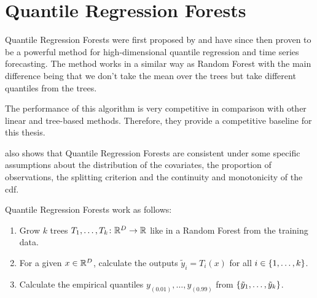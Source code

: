 \section{Quantile Regression Forests}
\label{sec:qrf}

Quantile Regression Forests were first proposed by \Textcite{Meinshausen2006}
and have since then proven to be a powerful method for high-dimensional quantile 
regression and time series forecasting. 
The method works in a similar way as Random Forest with the main difference 
being that we don't take the mean over the trees but take different quantiles 
from the trees.

The performance of this algorithm is very competitive in comparison with other 
linear and tree-based methods.
Therefore, they provide a competitive baseline for this thesis. 

\Textcite{Meinshausen2006} also shows that Quantile Regression Forests are consistent 
under some specific assumptions about the distribution of the covariates, the proportion of observations, the splitting criterion and the 
continuity and monotonicity of the \gls{cdf}.

Quantile Regression Forests work as follows:
\begin{enumerate}
    \item Grow \(k\) trees \(T_1, \ldots, T_k\colon \mathbb{R}^D \rightarrow \mathbb{R}\) like in a Random Forest from the training data.
    \item For a given \(x\in\mathbb{R}^D\), calculate the outputs \( \tilde{y}_i = T_i(x) \) for all \(i \in \{1, \ldots, k\}\).
    \item Calculate the empirical quantiles \(y_{(0.01)}, \ldots, y_{(0.99)}\) from 
    \(\{\tilde{y}_1, \ldots, \tilde{y}_k\}\).
\end{enumerate}